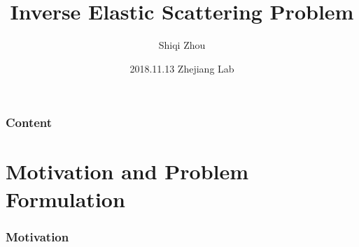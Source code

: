 \documentclass[cjk,8pt]{beamer}
\begin{document}
\begin{CJK*}{GBK}{kai}
\CJKtilde
\title[]{Inverse Elastic Scattering Problem}

\author[]{Shiqi Zhou}
\date[]{2018.11.13 Zhejiang Lab}




\begin{frame}
  \titlepage
\end{frame}

\begin{frame}
  \frametitle{Content}
  \setcounter{tocdepth}{1}
  \tableofcontents%
\end{frame}

\section{Motivation and Problem Formulation}

\begin{frame}
\frametitle{Motivation}
\begin{figure}


\end{figure}
\end{frame}
\end{CJK*}
\end{document}
